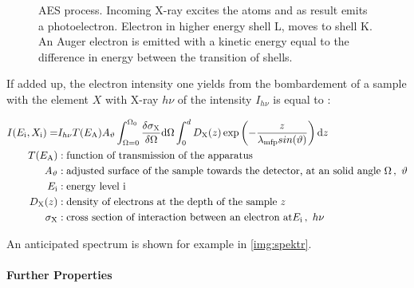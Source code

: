 \documentclass[numbers=noenddot,a4paper]{article}
\newcommand{\diff}{\textnormal{d}}
\newcommand{\ix}[1]{_\text{#1}}
\begin{document}
			\begin{figure}[h]
				\centering
				\caption{AES process. Incoming X-ray excites the atoms and as result emits a photoelectron. Electron in higher energy shell L, moves to shell K. An Auger electron is emitted with a kinetic energy equal to the difference in energy between the transition of shells. \cite{XPSAuger}}\label{img:auger}
			\end{figure}

	\clearpage

		If added up, the electron intensity one yields from the bombardement of a sample with the element $X$ with X-ray $h\nu$ of the intensity $I_{h\nu}$ is equal to \cite{XPSRapha}:

			\begin{align}
				I(E\ix{i},X\ix{i})=&I_{h\nu}T(E\ix{A})A_{\vartheta}\int_{\Omega=0}^{\Omega\ix{0}}\frac{\delta\sigma\ix{X}}{\delta\Omega}\diff \Omega\int_{0}^{d}D\ix{X}(z)\exp\left(-\frac{z}{\lambda\ix{mfp}sin(\vartheta)}\right)\diff z \label{eq:intens} \\
				T(E\ix{A})&: \text{function of transmission of the apparatus} \nonumber\\
				A_{\vartheta}&: \text{adjusted surface of the sample towards the detector, at an solid angle } \Omega\, ,\,\,\vartheta \nonumber\\
				E\ix{i}&: \text{energy level i} \nonumber\\
				D\ix{X}(z)&: \text{density of electrons at the depth of the sample } z \nonumber\\
				\sigma\ix{X}&: \text{cross section of interaction between an electron at} E\ix{i}\, ,\,\, h\nu \nonumber
			\end{align}

		An anticipated spectrum is shown for example in \autoref{img:spektr}.

		\paragraph{Further Properties}
\end{document}
